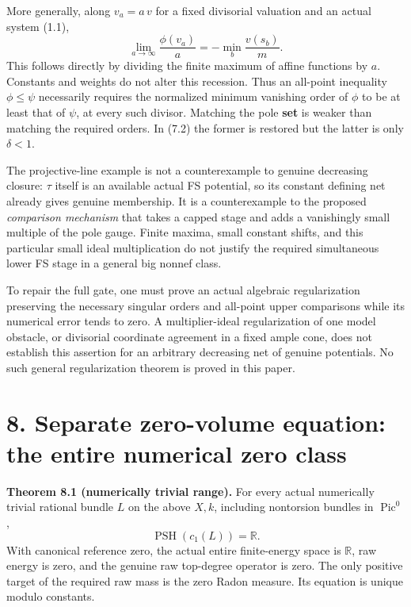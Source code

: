 \documentclass[10pt]{article}
\begin{document}
More generally, along \(v_a=a\,v\) for a fixed divisorial valuation and
an actual system (1.1), \[
 \lim_{a\to\infty}\frac{\phi(v_a)}a
 =-\min_b\frac{v(s_b)}m.
 \tag{7.3}
\] This follows directly by dividing the finite maximum of affine
functions by \(a\). Constants and weights do not alter this recession.
Thus an all-point inequality \(\phi\leq\psi\) necessarily requires the
normalized minimum vanishing order of \(\phi\) to be at least that of
\(\psi\), at every such divisor. Matching the pole \textbf{set} is
weaker than matching the required orders. In (7.2) the former is
restored but the latter is only \(\delta<1\).

The projective-line example is not a counterexample to genuine
decreasing closure: \(\tau\) itself is an available actual FS potential,
so its constant defining net already gives genuine membership. It is a
counterexample to the proposed \emph{comparison mechanism} that takes a
capped stage and adds a vanishingly small multiple of the pole gauge.
Finite maxima, small constant shifts, and this particular small ideal
multiplication do not justify the required simultaneous lower FS stage
in a general big nonnef class.

To repair the full gate, one must prove an actual algebraic
regularization preserving the necessary singular orders and all-point
upper comparisons while its numerical error tends to zero. A
multiplier-ideal regularization of one model obstacle, or divisorial
coordinate agreement in a fixed ample cone, does not establish this
assertion for an arbitrary decreasing net of genuine potentials. No such
general regularization theorem is proved in this paper.

\section{8. Separate zero-volume equation: the entire numerical zero
class}\label{separate-zero-volume-equation-the-entire-numerical-zero-class}

\textbf{Theorem 8.1 (numerically trivial range).} For every actual
numerically trivial rational bundle \(L\) on the above \(X,k\),
including nontorsion bundles in \(\operatorname{Pic}^0\), \[
 \operatorname{PSH}(c_1(L))=\mathbb R.
 \tag{8.1}
\] With canonical reference zero, the actual entire finite-energy space
is \(\mathbb R\), raw energy is zero, and the genuine raw top-degree
operator is zero. The only positive target of the required raw mass is
the zero Radon measure. Its equation is unique modulo constants.
\end{document}
